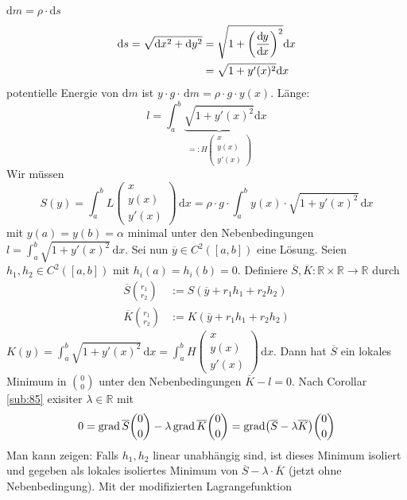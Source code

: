 $\mathrm{d}m = \rho \cdot \mathrm{d}s$
\begin{align*}
	  \mathrm{d}s = \sqrt{ \mathrm{d}x ^2 + \mathrm{d}y^2}   &= \sqrt{1+ \enbrace*{\diffd{y}{x} }^2 }  \mathrm{d}x   \\
	  &= \sqrt{1+ y'(x)^2} \mathrm{d}x   
\end{align*}
potentielle Energie von $ \mathrm{d}m$ ist $y \cdot  g \cdot  \, \mathrm{d}m = \rho \cdot g \cdot  y(x)$. Länge:
\[
	l = \int_{a} ^{b} \! \underbrace{\sqrt{1+ y'(x)^2}}_{=: H \begin{pmatrix}
		x \\ y(x) \\ y'(x)
	\end{pmatrix}}  \mathrm{d}x   
\]
Wir müssen 
\[
	S(y) = \int_{a} ^{b} \! L \begin{pmatrix}
		x \\ y(x) \\y'(x)
	\end{pmatrix}  \, \mathrm{d}x  = \rho \cdot g \cdot  \int_{a} ^{b} \! y(x) \cdot \sqrt{1+ y'(x)^2}  \, \mathrm{d}x   
\]
mit $y(a) = y(b) = \alpha$ minimal unter den Nebenbedingungen $l = \int_{a} ^{b} \! \sqrt{1+ y'(x)^2}  \, \mathrm{d}x   $. Sei nun $\overline{y} \in C^2([a,b])$ eine 
Lösung. Seien $h_1, h_2 \in C^2([a,b])$ mit $h_i (a) = h_i (b) = 0$. Definiere $\overline{S}, \overline{K} : \mathds{R}\times \mathds{R} \to \mathds{R}  $ durch 
\begin{align*}
	\overline{S} \binom{r_1}{r_2} &:= S(\overline{y} + r_1 h_1 + r_2 h_2 )  \\
	\overline{K} \binom{r_1}{r_2} &:= K(\overline{y} + r_1 h_1 + r_2 h_2)  
\end{align*} 
$K(y) = \int_{a} ^{b} \! \sqrt{1+ y'(x)^2}  \, \mathrm{d}x = \int_{a} ^{b} \! H \begin{pmatrix}
	x \\y(x) \\ y'(x) 
\end{pmatrix}   \, \mathrm{d}x $. Dann hat $\overline{S}$ ein lokales Minimum in $\binom{0}{0} $ unter den Nebenbedingungen $\overline{K} - l = 0 $. Nach Corollar \ref{sub:85} exisiter $\lambda \in \mathds{R}$ mit 
\[
	0 =\grad \overline{S} \binom{0}{0} - \lambda \grad \overline{K} \binom{0}{0} = \grad \enbrace*{\overline{S} - \lambda \overline{K}  } \binom{0}{0}  
\]
Man kann zeigen: Falls $h_1, h_2$ linear unabhängig sind, ist dieses Minimum isoliert und gegeben als lokales isoliertes Minimum von 
$\overline{S} - \lambda \cdot \overline{K}$ (jetzt ohne Nebenbedingung). Mit der modifizierten Lagrangefunktion 
